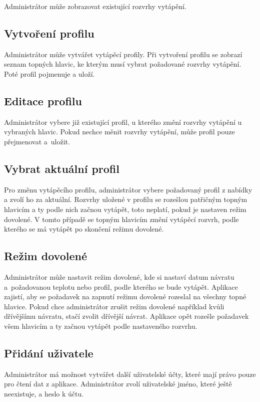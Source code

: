 \documentclass[thesis=B,czech]{FITthesis}[2012/10/20]
\begin{document}
Administrátor může zobrazovat existující rozvrhy vytápění.

\subsection{Vytvoření profilu}

Administrátor může vytvářet vytápěcí profily. Při vytvoření profilu se zobrazí seznam topných hlavic, ke kterým musí vybrat požadované rozvrhy vytápění. Poté profil pojmenuje a uloží.

\subsection{Editace profilu}

Administrátor vybere již existující profil, u kterého změní rozvrhy vytápění u vybraných hlavic. Pokud nechce měnit rozvrhy vytápění, může profil pouze přejmenovat a~uložit.

\subsection{Vybrat aktuální profil}

Pro změnu vytápěcího profilu, administrátor vybere požadovaný profil z nabídky a zvolí ho za aktuální. Rozvrhy uložené v profilu se rozešlou patřičným topným hlavicím a ty podle nich začnou vytápět, toto neplatí, pokud je nastaven režim dovolené. V tomto případě se topným hlavicím změní vytápěcí rozvrh, podle kterého se má vytápět po skončení režimu dovolené.

\subsection{Režim dovolené}

Administrátor může nastavit režim dovolené, kde si nastaví datum návratu a~požadovanou teplotu nebo profil, podle kterého se bude vytápět. Aplikace zajistí, aby se požadavek na zapnutí režimu dovolené rozeslal na všechny topné hlavice. Pokud chce administrátor zrušit režim dovolené například kvůli dřívějšímu návratu, stačí zvolit dřívější návrat. Aplikace opět rozešle požadavek všem hlavicím a ty začnou vytápět podle nastaveného rozvrhu.

\subsection{Přidání uživatele}

Administrátor má možnost vytvářet další uživatelské účty, které mají právo pouze pro čtení dat z aplikace. Administrátor zvolí uživatelské jméno, které ještě neexistuje, a heslo k účtu.
\end{document}
